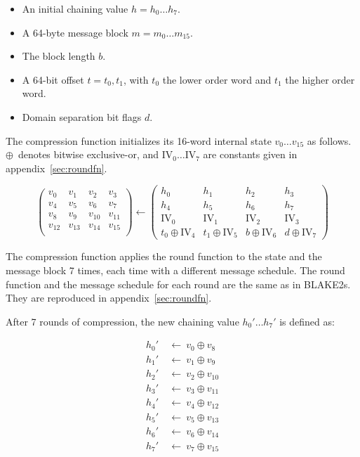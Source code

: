 \documentclass[11pt,notitlepage,a4paper]{article}
\newcommand{\IV}{\text{IV}}
\begin{document}
\begin{itemize}
    \item An initial chaining value $h = h_{0} \ldots h_{7}$.
    \item A 64-byte message block $m = m_{0} \ldots m_{15}$.
    \item The block length $b$.
    \item A 64-bit offset $t=t_{0},t_{1}$, with $t_{0}$ the lower order word
        and $t_{1}$ the higher order word.
    \item Domain separation bit flags $d$.
\end{itemize}

The compression function initializes its 16-word internal state $v_{0} \ldots
v_{15}$ as follows. $\oplus$~denotes bitwise exclusive-or, and $\IV_{0} \ldots
\IV_{7}$ are constants given in appendix~\ref{sec:roundfn}.

\begin{equation*}
\begin{pmatrix}
v_{0} & v_{1} & v_{2} & v_{3} \\
v_{4} & v_{5} & v_{6} & v_{7} \\
v_{8} & v_{9} & v_{10} & v_{11} \\
v_{12} & v_{13} & v_{14} & v_{15} \\
\end{pmatrix}
\leftarrow
\begin{pmatrix}
h_{0} & h_{1} & h_{2} & h_{3} \\
h_{4} & h_{5} & h_{6} & h_{7} \\
\IV_{0} & \IV_{1} & \IV_{2} & \IV_{3} \\
t_{0} \oplus \IV_{4} & t_{1} \oplus \IV_{5} & b \oplus \IV_{6} & d \oplus \IV_{7}
\end{pmatrix}
\end{equation*}

The compression function applies the round function to the state and the
message block 7 times, each time with a different message schedule. The round
function and the message schedule for each round are the same as in BLAKE2s.
They are reproduced in appendix~\ref{sec:roundfn}.

After 7 rounds of compression, the new chaining value $h_{0}' \ldots h_{7}'$ is
defined as:

\begin{align*}
    h_{0}' \ & \leftarrow \ v_{0} \oplus  v_{8} \\
    h_{1}' \ & \leftarrow \ v_{1} \oplus  v_{9} \\
    h_{2}' \ & \leftarrow \ v_{2} \oplus  v_{10} \\
    h_{3}' \ & \leftarrow \ v_{3} \oplus  v_{11} \\
    h_{4}' \ & \leftarrow \ v_{4} \oplus  v_{12} \\
    h_{5}' \ & \leftarrow \ v_{5} \oplus  v_{13} \\
    h_{6}' \ & \leftarrow \ v_{6} \oplus  v_{14} \\
    h_{7}' \ & \leftarrow \ v_{7} \oplus  v_{15}
\end{align*}
\end{document}
